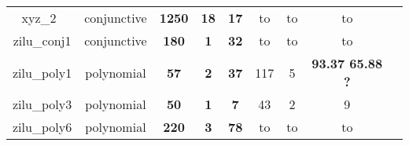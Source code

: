 \begin{table}[t]
\begin{tabular}{l c | c c c | c c c | c }
\multicolumn{1}{|c|}{xyz\_2~\cite{sharma2012interpolants}}			&conjunctive		& \textbf{1250} & \textbf{18} & \textbf{17}	& to & to & to &\multicolumn{1}{|c|}{\cmark} \\
%	
\multicolumn{1}{|c|}{zilu\_conj1}		&conjunctive		& \textbf{180} &\textbf{1}&\textbf{32}	& to & to &to		&\multicolumn{1}{|c|}{\cmark} \\
\multicolumn{1}{|c|}{zilu\_poly1}		&polynomial			& \textbf{57} & \textbf{2} &\textbf{37}	& 117 & 5  & \textbf{93.37 65.88 ?}		&\multicolumn{1}{|c|}{\cmark} \\
\multicolumn{1}{|c|}{zilu\_poly3}		&polynomial			& \textbf{50} & \textbf{1} &\textbf{7}		& 43 & 2  & 9			&\multicolumn{1}{|c|}{\cmark} \\
\multicolumn{1}{|c|}{zilu\_poly6}		&polynomial			& \textbf{220} & \textbf{3} &\textbf{78}	& to & to & to	&\multicolumn{1}{|c|}{\cmark} \\
%






\end{tabular}
\end{table}
